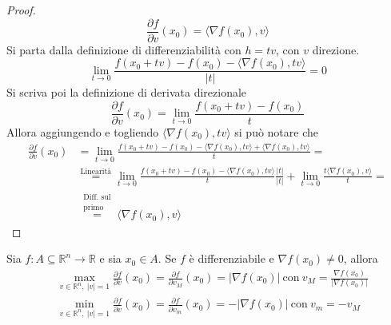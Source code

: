 \begin{proof}
        \begin{equation}
            \frac{\partial{f}}{\partial{v}}(x_0)=\langle \nabla f(x_0), v\rangle
        \end{equation}
        Si parta dalla definizione di differenziabilità con $h=tv$, con $v$ direzione.
        \begin{equation}
            \lim_{t \to 0} {\frac{f(x_0+tv)-f(x_0)-\langle \nabla f (x_0), tv \rangle}{|t|}}=0
        \end{equation}
        Si scriva poi la definizione di derivata direzionale
        \begin{equation}
            \frac{\partial f}{\partial v}(x_0)= \lim_{t \to 0}{\frac{f(x_0+tv)- f(x_0)}{t}}
        \end{equation}
        Allora aggiungendo e togliendo $\langle \nabla f (x_0), tv \rangle$ si può notare che
        \begin{equation}
            \begin{aligned}
                \frac{\partial f}{\partial v}(x_0)&= \lim_{t \to 0}{\frac{f(x_0+tv)- f(x_0) -\langle \nabla f (x_0), tv \rangle+ \langle \nabla f (x_0), tv \rangle}{t}}=\\
                &\overset{\text{Linearità}}{=} \lim_{t \to 0}{\frac{f(x_0+tv)- f(x_0) -\langle \nabla f (x_0), tv \rangle}{t} \frac{|t|}{|t|}} + \lim_{t \to 0}{\frac{t \langle \nabla f (x_0), v \rangle}{t}}=\\
                &\overset{\substack{\text{Diff. sul}\\\text{primo}}}{=} \langle \nabla f (x_0), v \rangle
            \end{aligned}
        \end{equation}
    \end{proof}
\begin{proposition} \label{Prop: Interpretazione geometrica del gradiente}
    Sia $f: A \subseteq \mathbb{R}^n \to \mathbb{R}$ e sia $x_0 \in A$. Se $f$ è differenziabile e $\nabla f(x_0) \neq 0$, allora
    \begin{equation}
        \begin{aligned}
            &\max_{v \in \mathbb{R}^n,\ |v|=1}{\frac{\partial f}{\partial v}{(x_0)}}=\frac{\partial f}{\partial v_M}(x_0)=|\nabla f(x_0)|\ \text{con}\ v_M= \frac{\nabla f(x_0)}{|\nabla f(x_0)|}\\
            &\min_{v \in \mathbb{R}^n,\ |v|=1}{\frac{\partial f}{\partial v}{(x_0)}}=\frac{\partial f}{\partial v_m}(x_0)=-|\nabla f(x_0)|\ \text{con}\ v_m= -v_M
        \end{aligned}
    \end{equation}
    \end{proposition}
